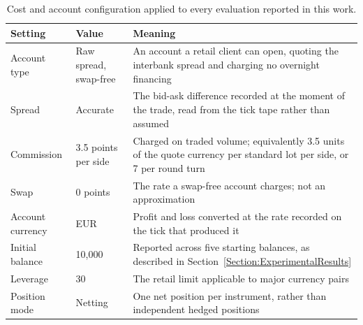 \begin{table}[htb!]
\centering
\footnotesize
\begin{tabularx}{\textwidth}{@{}llX@{}}
\toprule
\textbf{Setting} & \textbf{Value} & \textbf{Meaning} \\
\midrule
Account type & Raw spread, swap-free & An account a retail client can open, quoting the interbank spread and charging no overnight financing \\
\addlinespace
Spread & Accurate & The bid-ask difference recorded at the moment of the trade, read from the tick tape rather than assumed \\
\addlinespace
Commission & 3.5 points per side & Charged on traded volume; equivalently 3.5 units of the quote currency per standard lot per side, or 7 per round turn \\
\addlinespace
Swap & 0 points & The rate a swap-free account charges; not an approximation \\
\addlinespace
Account currency & EUR & Profit and loss converted at the rate recorded on the tick that produced it \\
\addlinespace
Initial balance & 10,000 & Reported across five starting balances, as described in Section~\ref{Section:ExperimentalResults} \\
\addlinespace
Leverage & 30 & The retail limit applicable to major currency pairs \\
\addlinespace
Position mode & Netting & One net position per instrument, rather than independent hedged positions \\
\bottomrule
\end{tabularx}
\caption{Cost and account configuration applied to every evaluation reported in this work.}
\label{Tables:CostModel}
\end{table}